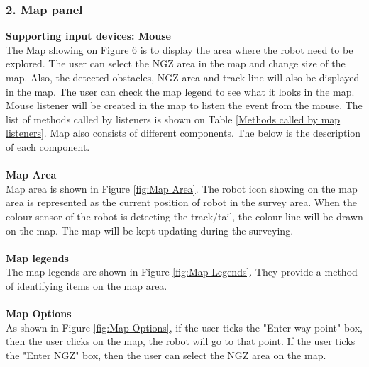 \subsubsection{2. Map panel}
\textbf{Supporting input devices: Mouse}\\
The Map showing on Figure 6 is to display the area where the robot need to be explored. The user can select the NGZ area in the map and change size of the map. Also, the detected obstacles, NGZ area and track line will also be displayed in the map. The user can check the map legend to see what it looks in the map. Mouse listener will be created in the map to listen the event from the mouse. The list of methods called by listeners is shown on Table \ref{Methods called by map listeners}. Map also consists of different components. The below is the description of each component.\\
\\
\textbf{Map Area}\\
Map area is shown in Figure \ref{fig:Map Area}. The robot icon showing on the map area is represented as the current position of robot in the survey area. When the colour sensor of the robot is detecting the track/tail, the colour line will be drawn on the map. The map will be kept updating during the surveying.\\
\\
\textbf{Map legends} \\
The map legends are shown in Figure \ref{fig:Map Legends}. They provide a method of identifying items on the map area.\\
\\
\textbf{Map Options}\\
As shown in Figure \ref{fig:Map Options}, if the user ticks the "Enter way point" box, then the user clicks on the map, the robot will go to that point. If the user ticks the "Enter NGZ" box, then the user can select the NGZ area on the map.

